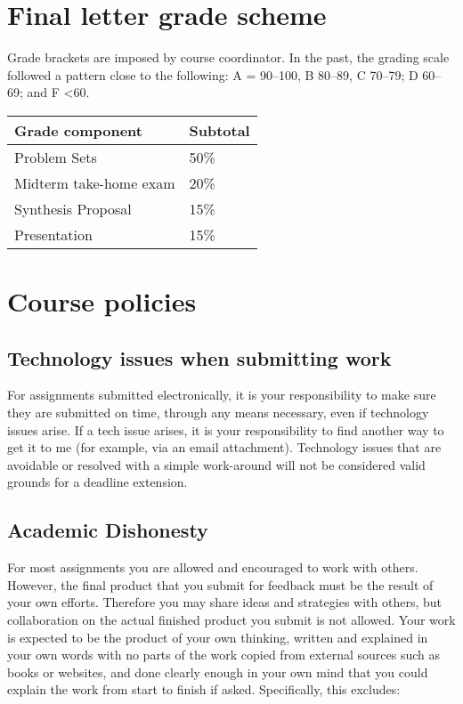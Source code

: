 \hypertarget{final-letter-grade-scheme}{%
\section{Final letter grade scheme}\label{final-letter-grade-scheme}}

Grade brackets are imposed by course coordinator. In the past, the
grading scale followed a pattern close to the following: A = 90--100, B
80--89, C 70--79; D 60--69; and F \textless60.

\begin{longtable}[]{@{}ll@{}}
\toprule
Grade component & Subtotal\tabularnewline
\midrule
\endhead
Problem Sets & 50\%\tabularnewline
Midterm take-home exam & 20\%\tabularnewline
Synthesis Proposal & 15\%\tabularnewline
Presentation & 15\%\tabularnewline
\bottomrule
\end{longtable}

\hypertarget{course-policies}{%
\section{Course policies}\label{course-policies}}

\hypertarget{technology-issues-when-submitting-work}{%
\subsection{Technology issues when submitting
work}\label{technology-issues-when-submitting-work}}

For assignments submitted electronically, it is your responsibility to
make sure they are submitted on time, through any means necessary, even
if technology issues arise. If a tech issue arises, it is your
responsibility to find another way to get it to me (for example, via an
email attachment). Technology issues that are avoidable or resolved with
a simple work-around will not be considered valid grounds for a deadline
extension.

\hypertarget{academic-dishonesty}{%
\subsection{Academic Dishonesty}\label{academic-dishonesty}}

For most assignments you are allowed and encouraged to work with others.
However, the final product that you submit for feedback must be the
result of your own efforts. Therefore you may share ideas and strategies
with others, but collaboration on the actual finished product you submit
is not allowed. Your work is expected to be the product of your own
thinking, written and explained in your own words with no parts of the
work copied from external sources such as books or websites, and done
clearly enough in your own mind that you could explain the work from
start to finish if asked. Specifically, this excludes:

